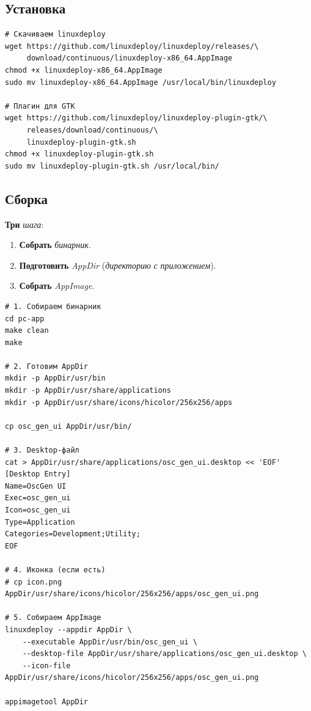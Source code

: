 \subsection{Установка}

\begin{listing}
\begin{verbatim}
# Скачиваем linuxdeploy
wget https://github.com/linuxdeploy/linuxdeploy/releases/\
     download/continuous/linuxdeploy-x86_64.AppImage
chmod +x linuxdeploy-x86_64.AppImage
sudo mv linuxdeploy-x86_64.AppImage /usr/local/bin/linuxdeploy

# Плагин для GTK
wget https://github.com/linuxdeploy/linuxdeploy-plugin-gtk/\
     releases/download/continuous/\
     linuxdeploy-plugin-gtk.sh
chmod +x linuxdeploy-plugin-gtk.sh
sudo mv linuxdeploy-plugin-gtk.sh /usr/local/bin/
\end{verbatim}
\caption{Установка \texttt{linuxdeploy}}
\label{lst:appimage-install}
\end{listing}

\subsection{Сборка}

\textbf{Три} \emph{шага}:

\begin{enumerate}
    \item \textbf{Собрать} \emph{бинарник}.
    \item \textbf{Подготовить} \emph{AppDir} (\emph{директорию}
          \emph{с} \emph{приложением}).
    \item \textbf{Собрать} \emph{AppImage}.
\end{enumerate}

\begin{listing}[htbp]
\begin{verbatim}
# 1. Собираем бинарник
cd pc-app
make clean
make

# 2. Готовим AppDir
mkdir -p AppDir/usr/bin
mkdir -p AppDir/usr/share/applications
mkdir -p AppDir/usr/share/icons/hicolor/256x256/apps

cp osc_gen_ui AppDir/usr/bin/

# 3. Desktop-файл
cat > AppDir/usr/share/applications/osc_gen_ui.desktop << 'EOF'
[Desktop Entry]
Name=OscGen UI
Exec=osc_gen_ui
Icon=osc_gen_ui
Type=Application
Categories=Development;Utility;
EOF

# 4. Иконка (если есть)
# cp icon.png AppDir/usr/share/icons/hicolor/256x256/apps/osc_gen_ui.png

# 5. Собираем AppImage
linuxdeploy --appdir AppDir \
    --executable AppDir/usr/bin/osc_gen_ui \
    --desktop-file AppDir/usr/share/applications/osc_gen_ui.desktop \
    --icon-file AppDir/usr/share/icons/hicolor/256x256/apps/osc_gen_ui.png

appimagetool AppDir
\end{verbatim}
\caption{Сборка AppImage}
\label{lst:appimage-build}
\end{listing}

